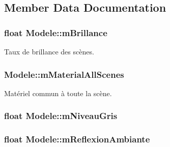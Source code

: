 \subsection{Member Data Documentation}
\subsubsection[{\texorpdfstring{m\+Brillance}{mBrillance}}]{\setlength{\rightskip}{0pt plus 5cm}float Modele\+::m\+Brillance}\hypertarget{class_modele_a0c2565f8fda9456201336b8413ce07fe}{}\label{class_modele_a0c2565f8fda9456201336b8413ce07fe}


Taux de brillance des scènes. 

\subsubsection[{\texorpdfstring{m\+Material\+All\+Scenes}{mMaterialAllScenes}}]{ Modele\+::m\+Material\+All\+Scenes}\hypertarget{class_modele_af5f2f7153778090d3bcefc6db83a89e4}{}\label{class_modele_af5f2f7153778090d3bcefc6db83a89e4}


Matériel commun à toute la scène. 

\subsubsection[{\texorpdfstring{m\+Niveau\+Gris}{mNiveauGris}}]{\setlength{\rightskip}{0pt plus 5cm}float Modele\+::m\+Niveau\+Gris}\hypertarget{class_modele_a3ab26b711a9452193a341479b3294464}{}\label{class_modele_a3ab26b711a9452193a341479b3294464}
\subsubsection[{\texorpdfstring{m\+Reflexion\+Ambiante}{mReflexionAmbiante}}]{\setlength{\rightskip}{0pt plus 5cm}float Modele\+::m\+Reflexion\+Ambiante}\hypertarget{class_modele_ab60784b5eb94976da411711a10046d1d}{}\label{class_modele_ab60784b5eb94976da411711a10046d1d}



